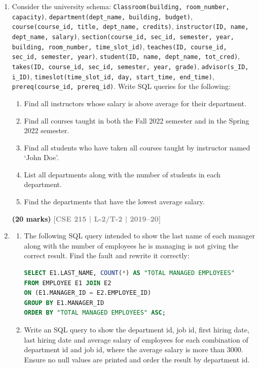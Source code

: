 \documentclass[12pt,a3paper]{article}
\newcommand{\yr}[1]{\hfill\textcolor{gray}{\small\textbf{[#1]}}}
\newcommand{\mk}[1]{\textcolor{orange!70!black}{\small\textbf{(#1 marks)}}}
\begin{document}
\begin{enumerate}
\item Consider the university schema: \texttt{Classroom(building, room\_number, capacity)}, \texttt{department(dept\_name, building, budget)}, \texttt{course(course\_id, title, dept\_name, credits)}, \texttt{instructor(ID, name, dept\_name, salary)}, \texttt{section(course\_id, sec\_id, semester, year, building, room\_number, time\_slot\_id)}, \texttt{teaches(ID, course\_id, sec\_id, semester, year)}, \texttt{student(ID, name, dept\_name, tot\_cred)}, \texttt{takes(ID, course\_id, sec\_id, semester, year, grade)}, \texttt{advisor(s\_ID, i\_ID)}, \texttt{timeslot(time\_slot\_id, day, start\_time, end\_time)}, \texttt{prereq(course\_id, prereq\_id)}. Write SQL queries for the following:
\begin{enumerate}
  \item Find all instructors whose salary is above average for their department.
  \item Find all courses taught in both the Fall 2022 semester and in the Spring 2022 semester.
  \item Find all students who have taken all courses taught by instructor named `John Doe'.
  \item List all departments along with the number of students in each department.
  \item Find the departments that have the lowest average salary.
\end{enumerate}
\mk{20} \yr{CSE 215 | L-2/T-2 | 2019--20}

\item 
\begin{enumerate}

\item  The following SQL query intended to show the last name of each manager along with the number of employees he is managing is not giving the correct result. Find the fault and rewrite it correctly:
\begin{lstlisting}[language=SQL]
SELECT E1.LAST_NAME, COUNT(*) AS "TOTAL MANAGED EMPLOYEES"
FROM EMPLOYEE E1 JOIN E2
ON (E1.MANAGER_ID = E2.EMPLOYEE_ID)
GROUP BY E1.MANAGER_ID
ORDER BY "TOTAL MANAGED EMPLOYEES" ASC;
\end{lstlisting}

\item  Write an SQL query to show the department id, job id, first hiring date, last hiring date and average salary of employees for each combination of department id and job id, where the average salary is more than 3000. Ensure no null values are printed and order the result by department id.


\end{enumerate}
\end{enumerate}
\end{document}
